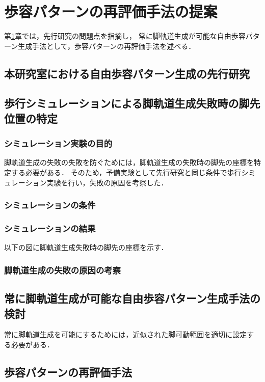 ﻿%

\chapter{歩容パターンの再評価手法の提案}\label{chapter:歩容パターンの再評価手法の提案}
第\ref{chapter:歩容パターンの再評価手法の提案}章では，先行研究の問題点を指摘し，
常に脚軌道生成が可能な自由歩容パターン生成手法として，歩容パターンの再評価手法を述べる．

\section{本研究室における自由歩容パターン生成の先行研究}


\section{歩行シミュレーションによる脚軌道生成失敗時の脚先位置の特定}

\subsection{シミュレーション実験の目的}
脚軌道生成の失敗の失敗を防ぐためには，脚軌道生成の失敗時の脚先の座標を特定する必要がある．
そのため，予備実験として先行研究と同じ条件で歩行シミュレーション実験を行い，失敗の原因を考察した．

\subsection{シミュレーションの条件}

\subsection{シミュレーションの結果}
以下の図に脚軌道生成失敗時の脚先の座標を示す．

\subsection{脚軌道生成の失敗の原因の考察}

\section{常に脚軌道生成が可能な自由歩容パターン生成手法の検討}
常に脚軌道生成を可能にするためには，近似された脚可動範囲を適切に設定する必要がある．

\section{歩容パターンの再評価手法}


